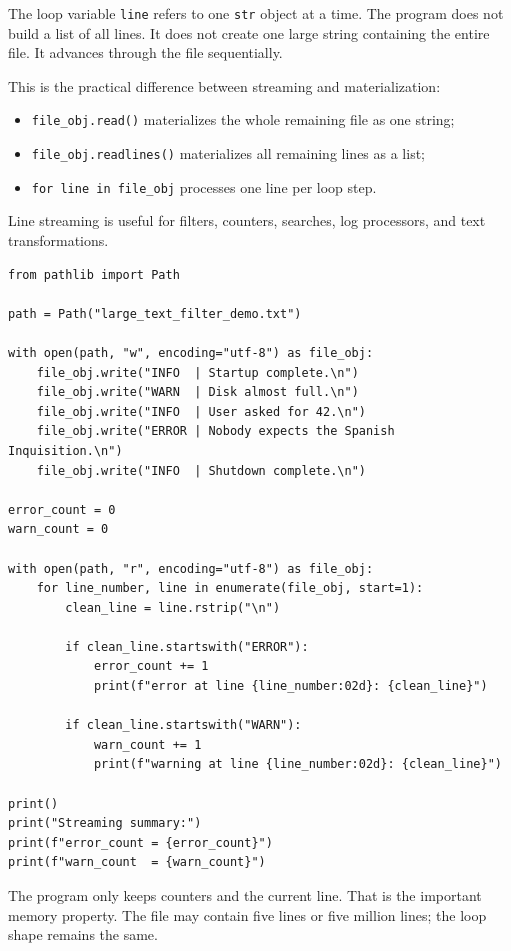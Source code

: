 The loop variable \texttt{line} refers to one \texttt{str} object at a time. The program does not build a list of all lines. It does not create one large string containing the entire file. It advances through the file sequentially.

This is the practical difference between streaming and materialization:

\begin{itemize}
    \item \texttt{file\_obj.read()} materializes the whole remaining file as one string;
    \item \texttt{file\_obj.readlines()} materializes all remaining lines as a list;
    \item \texttt{for line in file\_obj} processes one line per loop step.
\end{itemize}

Line streaming is useful for filters, counters, searches, log processors, and text transformations.

\begin{verbatim}
from pathlib import Path

path = Path("large_text_filter_demo.txt")

with open(path, "w", encoding="utf-8") as file_obj:
    file_obj.write("INFO  | Startup complete.\n")
    file_obj.write("WARN  | Disk almost full.\n")
    file_obj.write("INFO  | User asked for 42.\n")
    file_obj.write("ERROR | Nobody expects the Spanish Inquisition.\n")
    file_obj.write("INFO  | Shutdown complete.\n")

error_count = 0
warn_count = 0

with open(path, "r", encoding="utf-8") as file_obj:
    for line_number, line in enumerate(file_obj, start=1):
        clean_line = line.rstrip("\n")

        if clean_line.startswith("ERROR"):
            error_count += 1
            print(f"error at line {line_number:02d}: {clean_line}")

        if clean_line.startswith("WARN"):
            warn_count += 1
            print(f"warning at line {line_number:02d}: {clean_line}")

print()
print("Streaming summary:")
print(f"error_count = {error_count}")
print(f"warn_count  = {warn_count}")
\end{verbatim}

The program only keeps counters and the current line. That is the important memory property. The file may contain five lines or five million lines; the loop shape remains the same.

